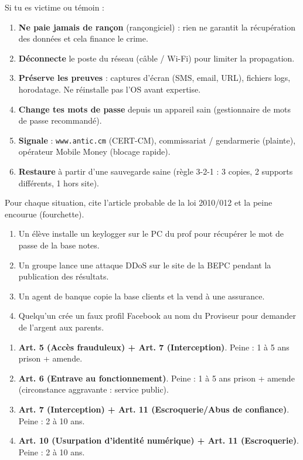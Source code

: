 \documentclass[11pt]{article}
\begin{document}
\begin{methode}
Si tu es victime ou témoin :
\begin{enumerate}
    \item \textbf{Ne paie jamais de rançon} (rançongiciel) : rien ne garantit la récupération des données et cela finance le crime.
    \item \textbf{Déconnecte} le poste du réseau (câble / Wi-Fi) pour limiter la propagation.
    \item \textbf{Préserve les preuves} : captures d'écran (SMS, email, URL), fichiers logs, horodatage. Ne réinstalle pas l'OS avant expertise.
    \item \textbf{Change tes mots de passe} depuis un appareil sain (gestionnaire de mots de passe recommandé).
    \item \textbf{Signale} : \texttt{www.antic.cm} (CERT-CM), commissariat / gendarmerie (plainte), opérateur Mobile Money (blocage rapide).
    \item \textbf{Restaure} à partir d'une sauvegarde saine (règle 3-2-1 : 3 copies, 2 supports différents, 1 hors site).
\end{enumerate}
\end{methode}

\begin{exercice}
Pour chaque situation, cite l'article probable de la loi 2010/012 et la peine encourue (fourchette).
\begin{enumerate}
    \item Un élève installe un keylogger sur le PC du prof pour récupérer le mot de passe de la base notes.
    \item Un groupe lance une attaque DDoS sur le site de la BEPC pendant la publication des résultats.
    \item Un agent de banque copie la base clients et la vend à une assurance.
    \item Quelqu'un crée un faux profil Facebook au nom du Proviseur pour demander de l'argent aux parents.
\end{enumerate}
\end{exercice}

\begin{corrige}
\begin{enumerate}
    \item \textbf{Art. 5 (Accès frauduleux) + Art. 7 (Interception)}. Peine : 1 à 5 ans prison + amende.
    \item \textbf{Art. 6 (Entrave au fonctionnement)}. Peine : 1 à 5 ans prison + amende (circonstance aggravante : service public).
    \item \textbf{Art. 7 (Interception) + Art. 11 (Escroquerie/Abus de confiance)}. Peine : 2 à 10 ans.
    \item \textbf{Art. 10 (Usurpation d'identité numérique) + Art. 11 (Escroquerie)}. Peine : 2 à 10 ans.
\end{enumerate}
\end{corrige}
\end{document}
